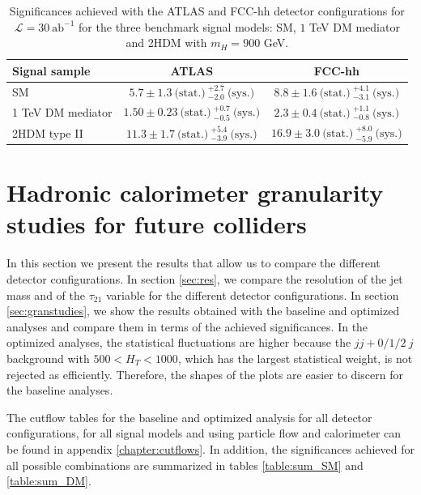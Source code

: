 \begin{table}
	\centering
	\caption{Significances achieved with the ATLAS and FCC-hh detector configurations for $\mathcal{L}=30~\text{ab}^{-1}$ for the three benchmark signal models: SM, $1$ TeV DM mediator and 2HDM with $m_H=900$ GeV.}
	\label{table:FCC_ATLAS_comp}
	\begin{tabular}{lcc}
		\toprule 
		\textbf{Signal sample} & ATLAS  & FCC-hh  \\
		\midrule
		SM & $5.7\pm 1.3 ~\text{(stat.)}~^{+2.7}_{-2.0}~\text{(sys.)}$ & $8.8\pm 1.6~\text{(stat.)}~^{+4.1}_{-3.1}~\text{(sys.)}$ \\
		\rowcolor{black!7}1 TeV DM mediator & $1.50\pm0.23 ~\text{(stat.)}~^{+0.7}_{-0.5}~\text{(sys.)}$ & $2.3\pm0.4 ~\text{(stat.)}~^{+1.1}_{-0.8}~\text{(sys.)}$ \\
		2HDM type II & $11.3\pm 1.7 ~\text{(stat.)}~^{+5.4}_{-3.9}~\text{(sys.)}$ &  $16.9\pm3.0~\text{(stat.)}~^{+8.0}_{-5.9}~\text{(sys.)}$\\ 
		\bottomrule

	\end{tabular}
	
\end{table}


\section{Hadronic calorimeter granularity studies for future colliders}
\label{sec:gran_studies}

In this section we present the results that allow us to compare the different detector configurations. In section \ref{sec:res}, we compare the resolution of the jet mass and of the $\tau_{21}$ variable for the different detector configurations. In section \ref{sec:granstudies}, we show the results obtained with the baseline and optimized analyses and compare them in terms of the achieved significances. In the optimized analyses, the statistical fluctuations are higher because the $jj+0/1/2~j$ background with $500<H_T<1000$, which has the largest statistical weight, is not rejected as efficiently. Therefore, the shapes of the plots are easier to discern for the baseline analyses. 

The cutflow tables for the baseline and optimized analysis for all detector configurations, for all signal models and using particle flow and calorimeter can be found in appendix \ref{chapter:cutflows}. In addition, the significances achieved for all possible combinations are summarized in tables \ref{table:sum_SM} and \ref{table:sum_DM}.

